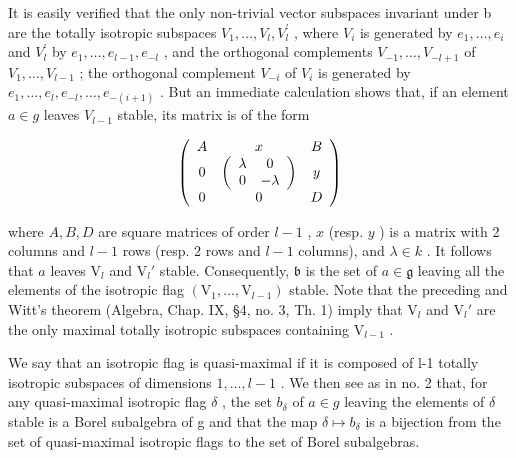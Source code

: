 It is easily verified that the only non-trivial vector subspaces invariant under b are the totally isotropic subspaces \(V_{1},\ldots,V_{l},V_{l}^{\prime}\) , where \(V_{i}\) is generated by \(e_{1},\ldots,e_{i}\) and \(V_{l}^{\prime}\) by \(e_{1},\ldots,e_{l-1},e_{-l}\) , and the orthogonal complements \(V_{-1},\ldots,V_{-l+1}\) of \(V_{1},\ldots,V_{l-1}\) ; the orthogonal complement \(V_{-i}\) of \(V_{i}\) is generated by \(e_{1},\ldots,e_{l},e_{-l},\ldots,e_{-(i+1)}\) . But an immediate calculation shows that, if an element \(a\in g\) leaves \(V_{l-1}\) stable, its matrix is of the form

\[
\left( \begin{array}{c c c} A & x & B \\ 0 & \left( \begin{array}{c c} \lambda & 0 \\ 0 & - \lambda \end{array} \right) & y \\ 0 & 0 & D \end{array} \right)
\]

where \(A, B, D\) are square matrices of order \(l - 1\) , \(x\) (resp. \(y\) ) is a matrix with 2 columns and \(l - 1\) rows (resp. 2 rows and \(l - 1\) columns), and \(\lambda \in k\) . It follows that \(a\) leaves \(\mathrm{V}_l\) and \(\mathrm{V}_l'\) stable. Consequently, \(\mathfrak{b}\) is the set of \(a \in \mathfrak{g}\) leaving all the elements of the isotropic flag \((\mathrm{V}_1, \ldots, \mathrm{V}_{l-1})\) stable. Note that the preceding and Witt's theorem (Algebra, Chap. IX, §4, no. 3, Th. 1) imply that \(\mathrm{V}_l\) and \(\mathrm{V}_l'\) are the only maximal totally isotropic subspaces containing \(\mathrm{V}_{l-1}\) .

We say that an isotropic flag is quasi-maximal if it is composed of l-1 totally isotropic subspaces of dimensions \(1,\ldots,l-1\) . We then see as in no. 2 that, for any quasi-maximal isotropic flag \(\delta\) , the set \(b_{\delta}\) of \(a\in g\) leaving the elements of \(\delta\) stable is a Borel subalgebra of g and that the map \(\delta\mapsto b_{\delta}\) is a bijection from the set of quasi-maximal isotropic flags to the set of Borel subalgebras.

